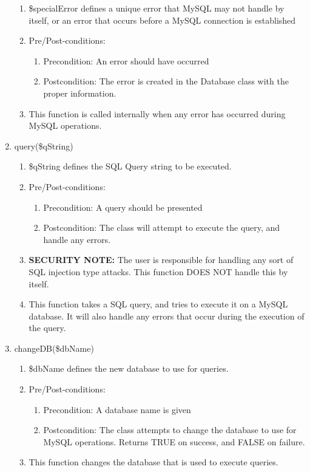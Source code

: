 \documentclass{article}
\begin{document}
\begin{enumerate}
\begin{enumerate}
\item \$specialError defines a unique error that MySQL may not handle by itself, or an error that occurs before a MySQL connection is established
\item Pre/Post-conditions:
\begin{enumerate}
\item Precondition: An error should have occurred
\item Postcondition: The error is created in the Database class with the proper information.
\end{enumerate}
\item This function is called internally when any error has occurred during MySQL operations.
\end{enumerate}
\item query(\$qString)
\begin{enumerate}
\item \$qString defines the SQL Query string to be executed.
\item Pre/Post-conditions:
\begin{enumerate}
\item Precondition: A query should be presented
\item Postcondition: The class will attempt to execute the query, and handle any errors.
\end{enumerate}
\item {\bf SECURITY NOTE:} The user is responsible for handling any sort of SQL injection type attacks. This function DOES NOT handle this by itself.
\item This function takes a SQL query, and tries to execute it on a MySQL database. It will also handle any errors that occur during the execution of the query.
\end{enumerate}
\item changeDB(\$dbName)
\begin{enumerate}
\item \$dbName defines the new database to use for queries.
\item Pre/Post-conditions:
\begin{enumerate}
\item Precondition: A database name is given
\item Postcondition: The class attempts to change the database to use for MySQL operations. Returns TRUE on success, and FALSE on failure.
\end{enumerate}
\item This function changes the database that is used to execute queries.

\end{enumerate}
\end{enumerate}
\end{document}
